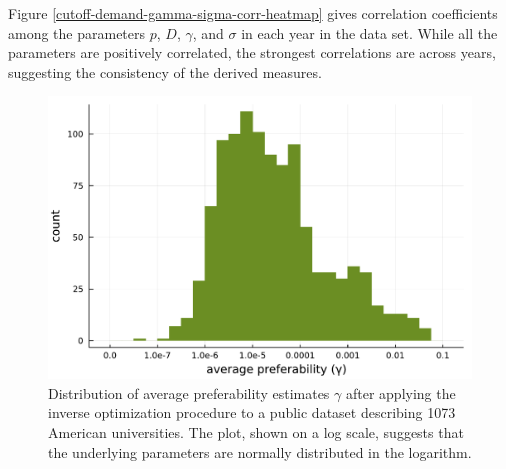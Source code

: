 \documentclass[12pt]{article}
\numberwithin{equation}{subsection}
\theoremstyle{definition}
\begin{document}
Figure \ref{cutoff-demand-gamma-sigma-corr-heatmap} gives correlation coefficients among the parameters $p$, $D$, $\gamma$, and $\sigma$ in each year in the data set. While all the parameters are positively correlated, the strongest correlations are across years, suggesting the consistency of the derived measures. 


\begin{figure}
\begin{center}\includegraphics[width=\linewidth, ]{singlescoreplots/average-preferability-hist.pdf}\end{center}
\captionsetup{singlelinecheck=off}
    \caption[.]{Distribution of average preferability estimates $\gamma$ after applying the inverse optimization procedure to a public dataset describing 1073 American universities. The plot, shown on a log scale, suggests that the underlying parameters are normally distributed in the logarithm. }
\label{average-preferability-hist}
\end{figure}
\end{document}
